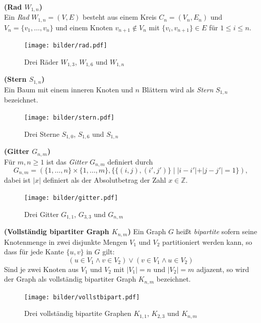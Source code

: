 \begin{defi}{\textbf{(Rad $W_{1,n}$)}}\\
Ein \emph{Rad} $W_{1,n}=(V,E)$ besteht aus einem Kreis $C_n=(V_n,E_n)$ und $V_n=\{v_1, \ldots ,v_n\}$ und einem Knoten $v_{n+1} \notin V_n$ mit $\{v_i, v_{n+1} \} \in E$ für $1 \leq i \leq n$. 
\end{defi}
\vspace{-2mm}
\begin{figure}[h!]
		\centering 		 
   \texttt{[image: bilder/rad.pdf]}
	\caption{Drei Räder $W_{1,3}$, $W_{1,6}$ und $W_{1,n}$}
  	 \end{figure}
\begin{defi}{\textbf{(Stern $S_{1,n}$)}}\\
\label{defstern}
Ein Baum mit einem inneren Knoten und $n$ Blättern wird als \emph{Stern} $S_{1,n}$ bezeichnet. \end{defi}
\vspace{-2mm}
\begin{figure}[h!]
		\centering 		 
   \texttt{[image: bilder/stern.pdf]}
	\caption{Drei Sterne $S_{1,0}$, $S_{1,6}$ und $S_{1,n}$}
  	 \end{figure}

\begin{defi}{\textbf{(Gitter $G_{n,m}$)}}\\
Für $m,n \geq 1$ ist das \emph{Gitter} $G_{n,m}$ definiert durch $$G_{n,m}=(\{1,\ldots,n\}\times\{1,\ldots ,m\},\{\{(i,j),(i',j')\}\;|\;|i-i'|+|j-j'|=1\} ),$$ dabei ist $|x|$ definiert als der Absolutbetrag der Zahl $x \in \mathbb{Z}$.\cite{exaktealgorithmenfuerschweregraphenprobleme} 
\end{defi}
\vspace{-4mm}
\begin{figure}[h!]
		\centering 		 
   \texttt{[image: bilder/gitter.pdf]}
	\caption{Drei Gitter $G_{1,1}$, $G_{3,3}$ und $G_{n,m}$}
  	 \end{figure}

\begin{defi}{\textbf{(Vollständig bipartiter Graph $K_{n,m}$)}}\newline
Ein Graph $G$ heißt \emph{bipartite} sofern seine Knotenmenge in zwei disjunkte Mengen $V_1$ und $V_2$ partitioniert werden kann, so dass für jede Kante $\{u,v\}$ in $G$ gilt: $$(u \in V_1 \wedge v \in V_2)\vee (v \in V_1 \wedge u \in V_2)$$Sind je zwei Knoten aus $V_1$ und $V_2$ mit $|V_1|=n$ und $|V_2|=m$ adjazent, so wird der Graph als vollständig bipartiter Graph $K_{n,m}$ bezeichnet. \end{defi}
\begin{figure}[h!]
		\centering 		 
   \texttt{[image: bilder/vollstbipart.pdf]}
	\caption{Drei vollständig bipartite Graphen $K_{1,1}$, $K_{2,3}$ und $K_{n,m}$}
  	 \end{figure}


